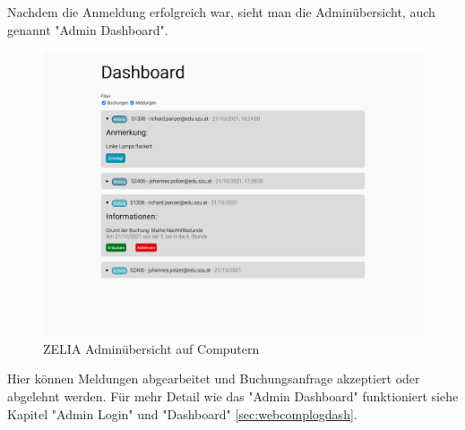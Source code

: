 Nachdem die Anmeldung erfolgreich war, sieht man die Adminübersicht, auch genannt "Admin Dashboard". 

\begin{figure}[H]
    \centering
    \includegraphics[width=120mm]{media/WebComponents/AdminSeite_light.png}
    \caption{ZELIA Adminübersicht auf Computern}
\end{figure}

Hier können Meldungen abgearbeitet und Buchungsanfrage akzeptiert oder abgelehnt werden.
Für mehr Detail wie das "Admin Dashboard" funktioniert siehe Kapitel "Admin Login" und "Dashboard" \ref{sec:webcomplogdash}.
